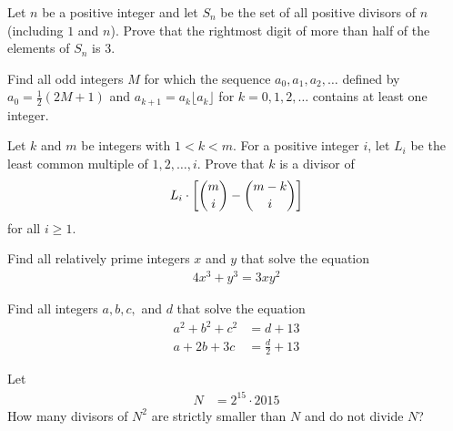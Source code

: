 \begin{problem}
	Let $n$ be a positive integer and let $S_n$ be the set of all positive divisors of $n$ (including $1$ and $n$). Prove that the rightmost digit of more than half of the elements of $S_n$ is $3$.
\end{problem}

\begin{problem}
	Find all odd integers $M$ for which the sequence $a_0,a_1,a_2,\dots$ defined by $a_0=\frac{1}{2}(2M+1)$ and $a_{k+1} = a_k \lfloor a_k \rfloor$ for $k=0,1,2,\dots$ contains at least one integer.
\end{problem}

\begin{problem}
	Let $k$ and $m$ be integers with $1 < k < m$. For a positive integer $i$, let $L_i$ be the least common multiple of $1,2,\ldots,i$.
	Prove that $k$ is a divisor of
		\begin{align*}
			L_i \cdot \left[\binom{m}{i} - \binom{m-k}{i}\right]
		\end{align*}
	for all $i \geq 1$. %
\end{problem}

\begin{problem}
	Find all relatively prime integers $x$ and $y$ that solve the equation
	\begin{align*}
		4x^3 + y^3 = 3xy^2
	\end{align*}
\end{problem}

\begin{problem}
	Find all integers $a,b,c,$ and $d$ that solve the equation
	\begin{align*}
		a^2 + b^2 + c^2 &= d + 13\\
		a + 2b + 3c &= \frac{d}{2}+ 13
	\end{align*}
\end{problem}

\begin{problem}
	Let
	\begin{align*}
		N &= 2^{15} \cdot 2015
	\end{align*}
	How many divisors of $N^2$ are strictly smaller than $N$ and do not divide $N$?
\end{problem}

